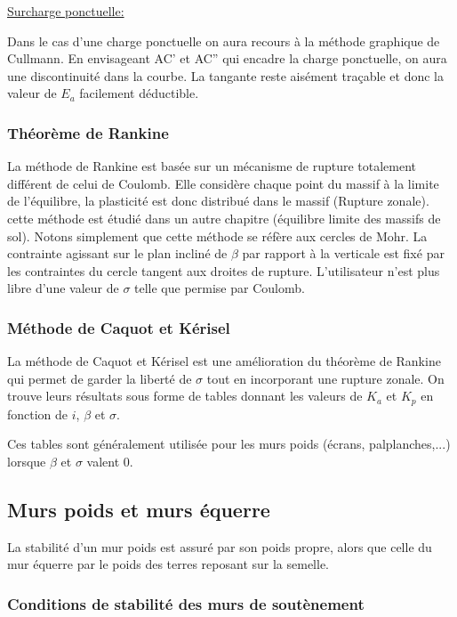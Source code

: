         \underline{Surcharge ponctuelle:} 
        
        Dans le cas d'une charge ponctuelle on aura recours à la méthode graphique de Cullmann. En envisageant AC' et AC'' qui encadre la charge ponctuelle, on aura une discontinuité dans la courbe. La tangante reste aisément traçable et donc la valeur de $E_a$ facilement déductible.
        
        \subsubsection{Théorème de Rankine}
        
        La méthode de Rankine est basée sur un mécanisme de rupture totalement différent de celui de Coulomb. Elle considère chaque point du massif à la limite de l'équilibre, la plasticité est donc distribué dans le massif (Rupture zonale). cette méthode est étudié dans un autre chapitre (équilibre limite des massifs de sol). Notons simplement que cette méthode se réfère aux cercles de Mohr. La contrainte agissant sur le plan incliné de $\beta$ par rapport à la verticale est fixé par les contraintes du cercle tangent aux droites de rupture. L'utilisateur n'est plus libre d'une valeur de $\sigma$ telle que permise par Coulomb.
        
        \subsubsection{Méthode de Caquot et Kérisel}
        
        La méthode de Caquot et Kérisel est une amélioration du théorème de Rankine qui permet de garder la liberté de $\sigma$ tout en incorporant une rupture zonale. On trouve leurs résultats sous forme de tables donnant les valeurs de $K_a$ et $K_p$ en fonction de $i$, $\beta$ et $\sigma$. 
        
        Ces tables sont généralement utilisée pour les murs poids (écrans, palplanches,...) lorsque $\beta$ et $\sigma$ valent 0.
        
    \subsection{Murs poids et murs équerre}
    
        La stabilité d'un mur poids est assuré par son poids propre, alors que celle du mur équerre par le poids des terres reposant sur la semelle.
        
        \subsubsection{Conditions de stabilité des murs de soutènement}
        
